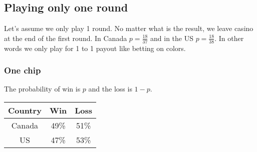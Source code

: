 \documentclass{book}
\begin{document}
	\subsection{Playing only one round}
	Let's assume we only play 1 round. No matter what is the result, we leave casino at the end of the first round. In Canada $p = \frac{18}{37}$ and in the US $p = \frac{18}{38}$. In other words we only play for 1 to 1 payout like betting on colors.
	\subsubsection{One chip}
	The probability of win is $p$ and the loss is $1 - p$. \\
	\par
	\begin{tabular}[h!]{c c c}
		\toprule
		Country & Win & Loss \\
		\midrule
		Canada & 49\% & 51\% \\
		US & 47\% & 53\% \\
		\bottomrule
	\end{tabular} \\
\end{document}
